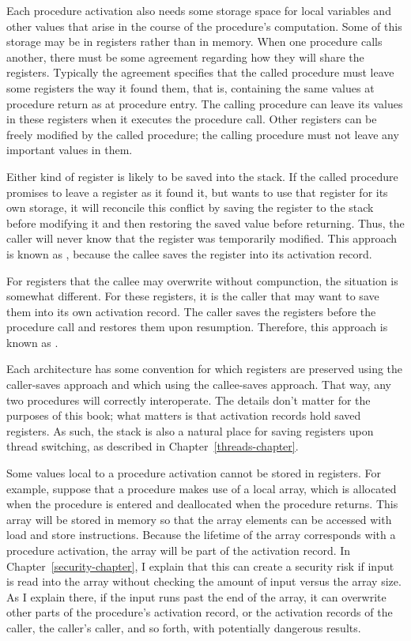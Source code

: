 Each procedure activation also needs some storage space for local
variables and other values that arise in the course of the procedure's
computation.  Some of this storage may be in registers rather than in
memory.  When one procedure calls another, there must be some
agreement regarding how they will share the registers.  Typically the
agreement specifies that the called procedure must leave some
registers the way it found them, that is, containing the same values
at procedure return as at procedure entry.  The calling procedure can
leave its values in these registers when it executes the procedure
call.  Other registers can be freely modified by the called procedure;
the calling procedure must not leave any important values in them.

Either kind of register is likely to be saved into the stack.  If the
called procedure promises to leave a register as it found it, but
wants to use that register for its own storage, it will reconcile this
conflict by saving the register to the stack before modifying it and then
restoring the saved value before returning.  Thus, the caller will
never know that the register was temporarily modified.  This
approach is known as , because the callee saves
the register
into its activation record.

For registers that the callee may overwrite without compunction, the
situation is somewhat different.  For these registers, it is the caller that may
want to save them into its own activation record.  The caller saves
the registers before the procedure
call and restores them upon resumption.  Therefore, this
approach is known as .

Each architecture has some convention for which registers are
preserved using the caller-saves approach and which using the
callee-saves approach.  That way,
any two procedures will correctly interoperate.  The details don't
matter for the purposes of this book; what matters is that activation
records hold saved registers.  As such, the stack is also a natural
place for saving registers upon thread switching, as described in 
Chapter~\ref{threads-chapter}.

Some values local to a procedure activation cannot be stored in
registers.  For example, suppose that a procedure makes use of a local
array, which is allocated when the procedure is entered and
deallocated when the procedure returns.  This array will be stored in
memory so that the array elements can be accessed with load and store
instructions.  Because the lifetime of the array corresponds with a
procedure activation, the array will be part of the activation
record.  In Chapter~\ref{security-chapter}, I explain that this can
create a security risk if input is read into the array without checking
the amount of input versus the array size.  As I explain there,
if the input runs past the end of the array, it can overwrite other
parts of the procedure's activation record, or the activation records
of the caller, the caller's caller, and so forth, with potentially
dangerous results.
